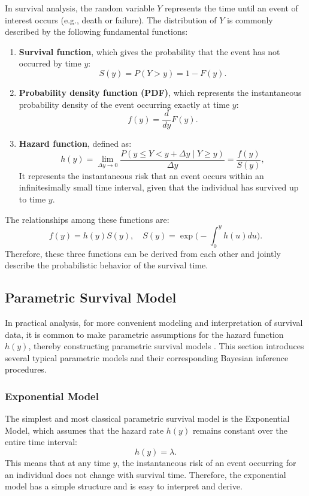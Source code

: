 In survival analysis, the random variable $Y$ represents the time until an event of interest occurs (e.g., death or failure). The distribution of $Y$ is commonly described by the following fundamental functions:
\begin{enumerate}
    \item \textbf{Survival function}, which gives the probability that the event has not occurred by time $y$:
   $$
   S(y) = P(Y > y) = 1 - F(y).
   $$
   \item \textbf{Probability density function (PDF)}, which represents the instantaneous probability density of the event occurring exactly at time $y$:
   $$
   f(y) = \frac{d}{dy} F(y).
   $$
   \item \textbf{Hazard function}, defined as:
   $$
   h(y) = \lim_{\Delta y \to 0} 
   \frac{P(y \le Y < y + \Delta y \mid Y \ge y)}{\Delta y}
   = \frac{f(y)}{S(y)},
   $$
   It represents the instantaneous risk that an event occurs within an infinitesimally small time interval, given that the individual has survived up to time \( y \).
\end{enumerate}

The relationships among these functions are:
$$
f(y) = h(y) S(y),
\quad
S(y) = \exp\Big( - \int_0^y h(u) du \Big).
$$
Therefore, these three functions can be derived from each other and jointly describe the probabilistic behavior of the survival time.

\subsection{Parametric Survival Model} 
In practical analysis, for more convenient modeling and interpretation of survival data, it is common to make parametric assumptions for the hazard function $h(y)$, thereby constructing parametric survival models \cite{ibrahim2013bayesian}. This section introduces several typical parametric models and their corresponding Bayesian inference procedures.

\subsubsection{Exponential Model} \label{Exponential Model}
The simplest and most classical parametric survival model is the Exponential Model, which assumes that the hazard rate $h(y)$ remains constant over the entire time interval:
$$
h(y) = \lambda.
$$
This means that at any time $y$, the instantaneous risk of an event occurring for an individual does not change with survival time. Therefore, the exponential model has a simple structure and is easy to interpret and derive.

